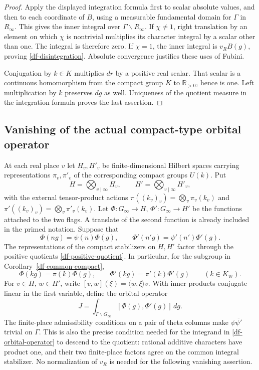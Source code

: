 \begin{proof}
Apply the displayed integration formula first to scalar absolute
values, and then to each coordinate of $B$, using a measurable
fundamental domain for $\Gamma$ in $R_\infty$.  This gives the
inner integral over $\Gamma\backslash R_\infty$.
If $\chi\ne1$, right translation by an element on which $\chi$
is nontrivial multiplies its character integral by a scalar other
than one.  The integral is therefore zero.  If $\chi=1$, the
inner integral is $v_R B(g)$, proving
\eqref{df-disintegration}.  Absolute convergence justifies these
uses of Fubini.

Conjugation by $k\in K$ multiplies $dr$ by a positive real scalar.
That scalar is a continuous homomorphism from the compact group
$K$ to $\mathbb R_{>0}$, hence is one.  Left multiplication by
$k$ preserves $dg$ as well.  Uniqueness of the quotient measure
in the integration formula proves the last assertion.
\end{proof}

\subsection{Vanishing of the actual compact-type orbital operator}

At each real place $v$ let $H_v,H'_v$ be finite-dimensional
Hilbert spaces carrying representations $\pi_v,\pi'_v$ of the
corresponding compact groups $U(k)$.  Put
\[
 H=\bigotimes_{v\mid\infty}H_v,\qquad
 H'=\bigotimes_{v\mid\infty}H'_v,
\]
with the external tensor-product actions
$\pi((k_v)_v)=\bigotimes_v\pi_v(k_v)$ and
$\pi'((k_v)_v)=\bigotimes_v\pi'_v(k_v)$.
Let
$\Phi:G_\infty\to H$, $\Phi':G_\infty\to H'$ be the functions
attached to the two flags.  A translate of the second function is
already included in the primed notation.  Suppose that
\[
 \Phi(ng)=\psi(n)\Phi(g),\qquad
 \Phi'(n'g)=\psi'(n')\Phi'(g).
\]
The representations of the compact stabilizers on $H,H'$ factor
through the positive quotients \eqref{df-positive-quotient}.
In particular, for the subgroup in Corollary~\ref{df-common-compact},
\[
 \Phi(kg)=\pi(k)\Phi(g),\qquad
 \Phi'(kg)=\pi'(k)\Phi'(g)\qquad(k\in K_W).
\]
For $v\in H$, $w\in H'$, write
$[v,w](\xi)=\langle w,\xi\rangle v$.  With inner products conjugate
linear in the first variable, define the orbital operator
\begin{equation}\label{df-orbital-operator}
 J=\int_{\Gamma\backslash G_\infty}
          [\Phi(g),\Phi'(g)]\,dg.
\end{equation}
The finite-place admissibility conditions on a pair of theta columns
make $\psi\overline{\psi'}$ trivial on $\Gamma$.  This is also the
precise condition needed for the integrand in
\eqref{df-orbital-operator} to descend to the quotient: rational
additive characters have product one, and their two finite-place
factors agree on the common integral stabilizer.  No normalization
of $v_R$ is needed for the following vanishing assertion.

